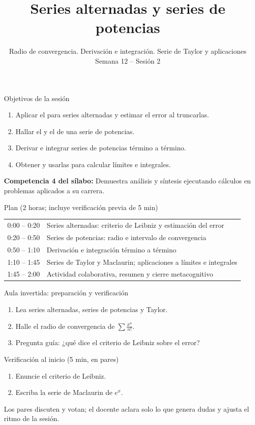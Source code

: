 \documentclass[10pt,aspectratio=169]{beamer}
\title[Series alternadas, de potencias y Taylor]{Series alternadas y series de potencias}
\subtitle{Radio de convergencia. Derivación e integración. Serie de Taylor y aplicaciones\\[2pt]\small Semana 12 -- Sesión 2}
\begin{document}
\begin{frame}
  \titlepage
\end{frame}

\begin{frame}{Objetivos de la sesión}
  \begin{enumerate}
    \item Aplicar el  para series alternadas y estimar el error al truncarlas.
    \item Hallar el  y el  de una serie de potencias.
    \item Derivar e integrar series de potencias término a término.
    \item Obtener  y usarlas para calcular límites e integrales.
  \end{enumerate}
  \vspace{1mm}
  {\small\textbf{Competencia 4 del sílabo:} Demuestra análisis y síntesis ejecutando cálculos en problemas aplicados a su carrera.}
  \begin{block}{Plan (2 horas; incluye verificación previa de 5 min)}
    \begin{tabular}{ll}
      0:00 -- 0:20 & Series alternadas: criterio de Leibniz y estimación del error\\
      0:20 -- 0:50 & Series de potencias: radio e intervalo de convergencia\\
      0:50 -- 1:10 & Derivación e integración término a término\\
      1:10 -- 1:45 & Series de Taylor y Maclaurin; aplicaciones a límites e integrales\\
      1:45 -- 2:00 & Actividad colaborativa, resumen y cierre metacognitivo
    \end{tabular}
  \end{block}
\end{frame}

\begin{frame}{Aula invertida: preparación y verificación}
  \small
  \begin{previa}
    \begin{enumerate}
      \item Lea series alternadas, series de potencias y Taylor.
      \item Halle el radio de convergencia de $\sum\frac{x^n}{n!}$.
      \item Pregunta guía: ¿qué dice el criterio de Leibniz sobre el error?
    \end{enumerate}
  \end{previa}
  \begin{block}{Verificación al inicio (5 min, en pares)}
    \begin{enumerate}
      \item Enuncie el criterio de Leibniz.
      \item Escriba la serie de Maclaurin de $e^x$.
    \end{enumerate}
    Los pares discuten y votan; el docente aclara solo lo que genera dudas y ajusta el ritmo de la sesión.
  \end{block}
\end{frame}
\end{document}
